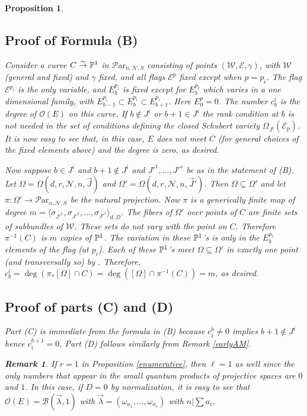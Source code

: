 \documentclass[11pt]{amsart}
\newcommand\me{\mathcal{E}}
\newcommand\mw{\mathcal{W}}
\newcommand\mn{\mathcal{N}}
\newcommand\Par{\mathcal{P}\text{ar} }
\newcommand{\leto}[1]{\stackrel{#1}{\to}}
\newtheorem{remark}[theorem]{ Remark}
\newtheorem{proposition}[theorem]{Proposition}
\numberwithin{theorem}{subsection}
\begin{document}
{\begin{proposition}
\subsection{Proof of Formula (B)}
Consider a curve $C\leto{\sim} \Bbb{P}^1$ in $\Par_{n,\mn,S}$ consisting of points $(\mw,\me,\gamma)$, with $\mw$ (general and fixed) and $\gamma$ fixed, and all flags $\me^p$ fixed except when $p=p_i$. The flag $\me^{p_i}$ is the only variable, and $E^{p_i}_k$ is fixed except for $E^{p_i}_{b}$ which varies in a one dimensional family, with $E^{p_i}_{b-1}\subset E^{p_i}_b\subset E^{p_i}_{b+1}$. Here $E^p_0=0$. The number $c^i_b$ is the degree of $\mathcal{O}(E)$ on this curve. If $b\not\in J^i$ or $b+1\in J^i$  the rank condition at $b$ is not needed in the set of conditions defining the closed Schubert variety $\Omega_{J^i}(\me_p)$. It is now easy to see that, in this case, $E$ does not meet $C$ (for general choices of the fixed elements above) and the degree is zero, as desired.

Now suppose $b\in J^i$ and $b+1\not\in J^i$ and $J'^1,\dots,J'^s$ be as in the statement of (B). Let  $\Omega=\Omega(d,r,\mn,n,\vec{J})$ and $\Omega'=\Omega(d,r,\mn,n,\vec{J}')$. Then $\Omega\subseteq \Omega'$ and let $\pi:\Omega'\to \Par_{n,\mn,S}$ be the natural projection. Now $\pi$ is a generically finite map of degree $m=\langle\sigma_{J'^1}, \sigma_{J'^2},\dots,\sigma_{J'^s}\rangle_{d,D}$.  The fibers of $\Omega'$ over points of $C$ are finite sets of subbundles of $\mw$. These sets do not vary with the point on $C$. Therefore $\pi^{-1}(C)$ is $m$ copies of $\Bbb{P}^1$. The variation in these $\Bbb{P}^1$'s is only in the  $E^{p_i}_b$ elements of the flag (at $p_i$). Each of these $\Bbb{P}^1$'s meet $\Omega\subseteq \Omega'$ in exactly one point (and transversally so) by \cite[Lemma 8.8]{BHermit}. Therefore, $c^i_b =\deg(\pi_*[\Omega]\cap C)= \deg([\Omega]\cap \pi^{-1}(C))=m$, as desired.
\subsection{Proof of parts (C) and (D)}
Part (C) is immediate from the formula in (B) because $c_i^b\neq 0$ implies $b+1\notin J^i$ hence
$c_i^{b+1}=0$. Part (D) follows similarly from Remark \ref{earlyAM}.

\begin{remark}\label{ajabaja}
If $r=1$ in Proposition \ref{enumerative}, then $\ell=1$ as well since the only numbers that appear in the small quantum products of projective spaces are $0$ and $1$. In this case, if $D=0$ by normalization, it is easy to see that $\mathcal{O}(E)=\mathcal{B}(\vec{\lambda},1)$ with $\vec{\lambda}=(\omega_{a_1},\dots,\omega_{a_s})$ with $n|\sum a_i$.
\end{remark}

\end{proposition}}
\end{document}
